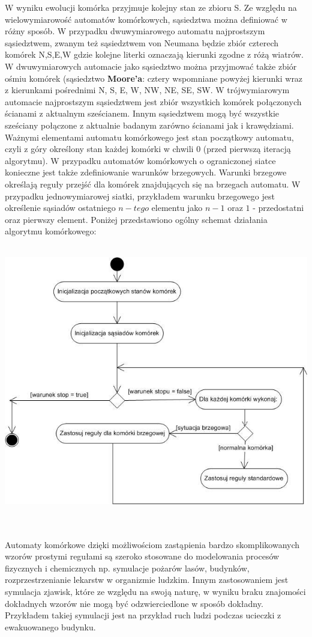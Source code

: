W wyniku ewolucji komórka przyjmuje kolejny stan ze zbioru S. Ze względu na wielowymiarowość automatów komórkowych, sąsiedztwa można
definiować w różny sposób. W przypadku dwuwymiarowego automatu najprostszym sąsiedztwem, zwanym też sąsiedztwem von Neumana będzie
zbiór czterech komórek {N,S,E,W} gdzie kolejne literki oznaczają kierunki zgodne z różą wiatrów. W dwuwymiarowych automacie jako sąsiedztwo można przyjmować także zbiór ośmiu komórek (sąsiedztwo \textbf{Moore'a}: cztery wspomniane powyżej kierunki wraz z kierunkami pośrednimi {N, S, E, W, NW, NE, SE, SW}. W trójwymiarowym automacie najprostszym sąsiedztwem jest zbiór wszystkich 
komórek połączonych ścianami z aktualnym sześcianem. Innym sąsiedztwem mogą być wszystkie sześciany połączone z aktualnie badanym
zarówno ścianami jak i krawędziami. Ważnymi elementami automatu komórkowego jest stan początkowy automatu, czyli z góry określony
stan każdej komórki w chwili 0 (przed pierwszą iteracją algorytmu). W przypadku automatów komórkowych o ograniczonej siatce konieczne
jest także zdefiniowanie warunków brzegowych. Warunki brzegowe określają reguły przejść dla komórek znajdujących się na brzegach
automatu. W przypadku jednowymiarowej siatki, przykładem warunku brzegowego jest określenie sąsiadów ostatniego $n-tego$ elementu jako 
$n-1$ oraz $1$ - przedostatni oraz pierwszy element.
Poniżej przedstawiono ogólny schemat działania algorytmu komórkowego: \\\\
\begin{center}
\includegraphics{algorytm_automatu_kom}
\end{center}
\\\\
Automaty komórkowe dzięki możliwościom zastąpienia bardzo skomplikowanych wzorów prostymi regułami są szeroko stosowane do modelowania
procesów fizycznych i chemicznych np. symulacje pożarów lasów, budynków, rozprzestrzenianie lekarstw w organizmie ludzkim. 
Innym zastosowaniem jest symulacja zjawisk, które ze względu na swoją naturę, w wyniku braku znajomości
dokładnych wzorów nie mogą być odzwierciedlone w sposób dokładny. Przykładem takiej symulacji jest na przykład ruch ludzi podczas ucieczki z ewakuowanego budynku.
